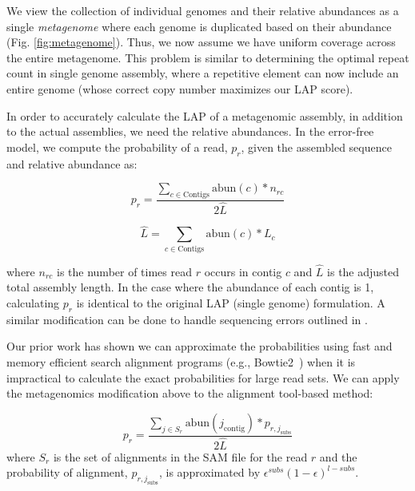 \documentclass[conference]{IEEEtran}
\begin{document}
We view the collection of individual genomes and their relative abundances as a single \emph{metagenome} where each genome is duplicated based on their abundance (Fig. \ref{fig:metagenome}).
Thus, we now assume we have uniform coverage across the entire metagenome.
This problem is similar to determining the optimal repeat count in single genome assembly, where a repetitive element can now include an entire genome (whose correct copy number maximizes our LAP score).

In order to accurately calculate the LAP of a metagenomic assembly, in addition to the actual assemblies, we need the relative abundances.
In the error-free model, we compute the probability of a read, $p_r$, given the assembled sequence and relative abundance as:

\begin{equation}
  \label{meta_read_probability}
  p_r = \frac{\sum_{c \in \text{Contigs}}\text{abun}(c)*n_{rc}}{2\hat{L}}
\end{equation}

\begin{equation}
  \label{meta_read_length}
  \hat{L} = \sum_{c \in \text{Contigs}}\text{abun}(c)*L_{c}
\end{equation}

where $n_{rc}$ is the number of times read $r$ occurs in contig $c$ and $\hat{L}$ is the adjusted total assembly length.  In the case where the abundance of each contig is 1, calculating $p_r$ is identical to the original LAP (single genome) formulation.  A similar modification can be done to handle sequencing errors outlined in \cite{LAP}.

Our prior work has shown we can approximate the probabilities using fast and memory efficient search alignment programs (e.g., Bowtie2~\cite{langmead2012fast}) when it is impractical to calculate the exact probabilities for large read sets.
We can apply the metagenomics modification above to the alignment tool-based method:

\begin{equation}
\label{}
p_{r} = \frac{\sum_{j \in S_r} \text{abun}(j_{\text{contig}})*p_{r,j_{\text{subs}}}}{2\hat{L}}
\end{equation}
where $S_r$ is the set of alignments in the SAM file for the read $r$ and the probability of alignment, $p_{r,j_{\text{subs}}}$, is approximated by $\epsilon^{subs}(1 - \epsilon)^{l - subs}$.
\end{document}
